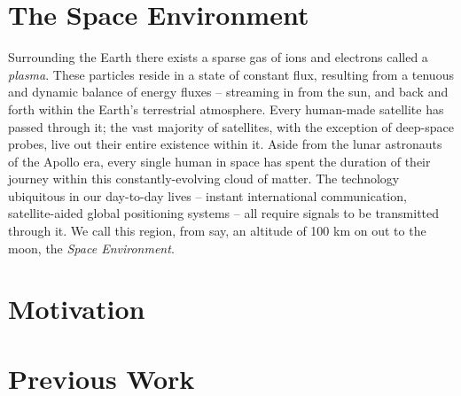 \section{The Space Environment}
Surrounding the Earth there exists a sparse gas of ions and electrons called a \emph{plasma}. These particles reside in a state of constant flux, resulting from a tenuous and dynamic balance of energy fluxes -- streaming in from the sun, and back and forth within the Earth's terrestrial atmosphere. Every human-made satellite has passed through it; the vast majority of satellites, with the exception of deep-space probes, live out their entire existence within it. Aside from the lunar astronauts of the Apollo era, every single human in space has spent the duration of their journey within this constantly-evolving cloud of matter. The technology ubiquitous in our day-to-day lives -- instant international communication, satellite-aided global positioning systems -- all require signals to be transmitted through it. We call this region, from say, an altitude of 100 km on out to the moon, the \emph{Space Environment}.

\section{Motivation}
\section{Previous Work}
